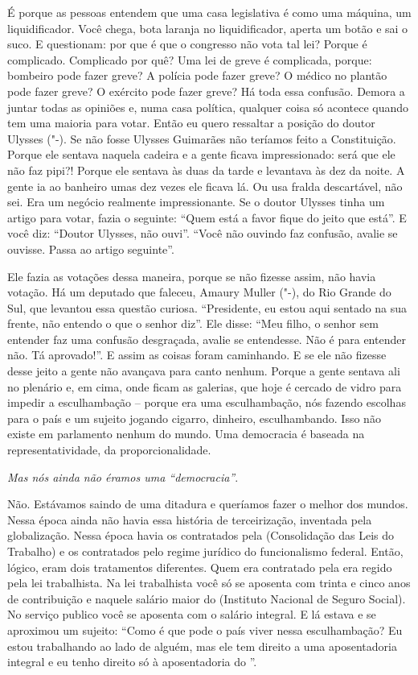 É porque as pessoas entendem que uma casa legislativa
é como uma máquina, um liquidificador. Você chega, bota laranja no
liquidificador, aperta um botão e sai o suco. E questionam: por que é
que o congresso não vota tal lei? Porque é complicado. Complicado por
quê? Uma lei de greve é complicada, porque: bombeiro pode fazer greve? A
polícia pode fazer greve? O médico no plantão pode fazer greve? O
exército pode fazer greve? Há toda essa confusão. Demora a juntar todas
as opiniões e, numa casa política, qualquer coisa só acontece quando tem
uma maioria para votar. Então eu quero ressaltar a posição do doutor
Ulysses ("-). Se não fosse Ulysses Guimarães não teríamos feito a
Constituição. Porque ele sentava naquela cadeira e a gente ficava
impressionado: será que ele não faz pipi?! Porque ele sentava às duas da
tarde e levantava às dez da noite. A gente ia ao banheiro umas dez vezes
ele ficava lá. Ou usa fralda descartável, não sei. Era um negócio
realmente impressionante. Se o doutor Ulysses tinha um artigo para
votar, fazia o seguinte: ``Quem está a favor fique do jeito que está''. E
você diz: ``Doutor Ulysses, não ouvi''. ``Você não ouvindo faz confusão,
avalie se ouvisse. Passa ao artigo seguinte''.

Ele fazia as votações dessa maneira, porque se não fizesse assim, não
havia votação. Há um deputado que faleceu, Amaury Muller ("-), do
Rio Grande do Sul, que levantou essa questão curiosa. ``Presidente, eu
estou aqui sentado na sua frente, não entendo o que o senhor diz''. Ele
disse: ``Meu filho, o senhor sem entender faz uma confusão desgraçada,
avalie se entendesse. Não é para entender não. Tá aprovado!''. E assim as
coisas foram caminhando. E se ele não fizesse desse jeito a gente não
avançava para canto nenhum. Porque a gente sentava ali no plenário e, em
cima, onde ficam as galerias, que hoje é cercado de vidro para impedir a
esculhambação -- porque era uma esculhambação, nós fazendo escolhas para
o país e um sujeito jogando cigarro, dinheiro, esculhambando. Isso não
existe em parlamento nenhum do mundo. Uma democracia é baseada na
representatividade, da proporcionalidade.

\medskip

\noindent\emph{Mas nós ainda não éramos uma ``democracia''}.

Não. Estávamos saindo de uma ditadura e queríamos
fazer o melhor dos mundos. Nessa época ainda não havia essa história de
terceirização, inventada pela globalização. Nessa época havia os
contratados pela  (Consolidação das Leis do Trabalho) e os
contratados pelo regime jurídico do funcionalismo federal. Então,
lógico, eram dois tratamentos diferentes. Quem era contratado pela 
era regido pela lei trabalhista. Na lei trabalhista você só se aposenta
com trinta e cinco anos de contribuição e naquele salário maior do 
(Instituto Nacional de Seguro Social). No serviço publico você se
aposenta com o salário integral. E lá estava e se aproximou um sujeito:
``Como é que pode o país viver nessa esculhambação? Eu estou trabalhando
ao lado de alguém, mas ele tem direito a uma aposentadoria integral e eu
tenho direito só à aposentadoria do ''.

